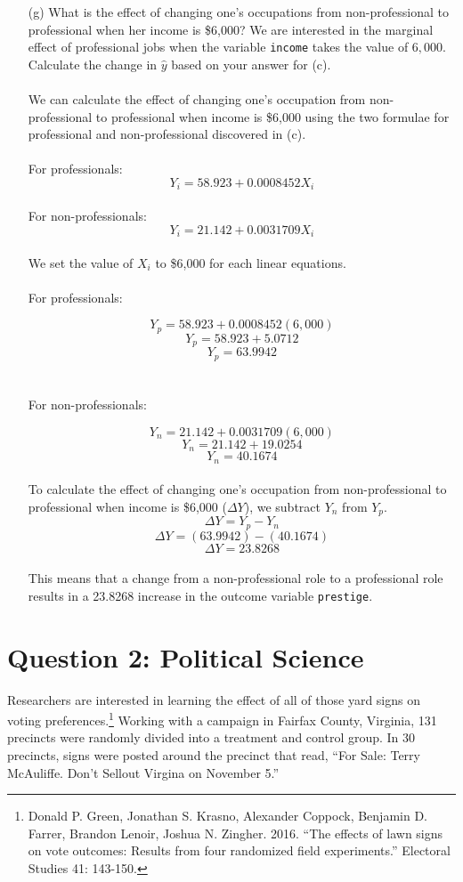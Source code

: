\documentclass[12pt,letterpaper]{article}
\begin{document}
\begin{enumerate}
	
	\item [(g)]
	What is the effect of changing one's occupations from non-professional to professional when her income is \$6,000? We are interested in the marginal effect of professional jobs when the variable \texttt{income} takes the value of $6,000$. Calculate the change in $\hat{y}$ based on your answer for (c).
\\\\
\noindent We can calculate the effect of changing one's occupation from non-professional to professional when income is \$6,000 using the two formulae for professional and non-professional discovered in (c).
\\\\
\noindent For professionals:
\[Y_i = 58.923 + 0.0008452X_i\]
\\
\noindent For non-professionals:
\[Y_i = 21.142 + 0.0031709X_i\]
\\
\noindent We set the value of $X_i$ to \$6,000 for each linear equations.
\\\\
\noindent For professionals:

\[Y_p = 58.923 + 0.0008452(6,000)\]
\[Y_p = 58.923 + 5.0712\]
\[Y_p =63.9942\]
\\\\
\noindent For non-professionals:

\[Y_n = 21.142 + 0.0031709(6,000)\]
\[Y_n = 21.142 + 19.0254\]
\[Y_n = 40.1674\]	
\\
\noindent To calculate the effect of changing one's occupation from non-professional to professional when income is \$6,000 ($\Delta Y$), we subtract $Y_n$ from $Y_p$.
\\
\[\Delta Y = Y_p - Y_n\]
\[\Delta Y =(63.9942) - (40.1674)\]
\[\Delta Y = 23.8268\]
\\
\noindent This means that a change from a non-professional role to a professional role results in a 23.8268 increase in the outcome variable \texttt{prestige}.
	
\end{enumerate}

\newpage

\section*{Question 2: Political Science}
\vspace{.25cm}
\noindent 	Researchers are interested in learning the effect of all of those yard signs on voting preferences.\footnote{Donald P. Green, Jonathan	S. Krasno, Alexander Coppock, Benjamin D. Farrer,	Brandon Lenoir, Joshua N. Zingher. 2016. ``The effects of lawn signs on vote outcomes: Results from four randomized field experiments.'' Electoral Studies 41: 143-150. } Working with a campaign in Fairfax County, Virginia, 131 precincts were randomly divided into a treatment and control group. In 30 precincts, signs were posted around the precinct that read, ``For Sale: Terry McAuliffe. Don't Sellout Virgina on November 5.'' \\
\end{document}
